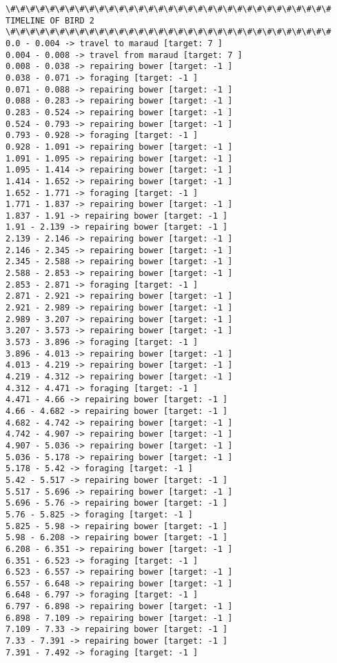 \documentclass[11pt]{article}
\begin{document}
\begin{Verbatim}[commandchars=\\\{\}]
\#\#\#\#\#\#\#\#\#\#\#\#\#\#\#\#\#\#\#\#\#\#\#\#\#\#\#\#\#\#\#\#\#
TIMELINE OF BIRD 2
\#\#\#\#\#\#\#\#\#\#\#\#\#\#\#\#\#\#\#\#\#\#\#\#\#\#\#\#\#\#\#\#\#
0.0 - 0.004 -> travel to maraud [target: 7 ]
0.004 - 0.008 -> travel from maraud [target: 7 ]
0.008 - 0.038 -> repairing bower [target: -1 ]
0.038 - 0.071 -> foraging [target: -1 ]
0.071 - 0.088 -> repairing bower [target: -1 ]
0.088 - 0.283 -> repairing bower [target: -1 ]
0.283 - 0.524 -> repairing bower [target: -1 ]
0.524 - 0.793 -> repairing bower [target: -1 ]
0.793 - 0.928 -> foraging [target: -1 ]
0.928 - 1.091 -> repairing bower [target: -1 ]
1.091 - 1.095 -> repairing bower [target: -1 ]
1.095 - 1.414 -> repairing bower [target: -1 ]
1.414 - 1.652 -> repairing bower [target: -1 ]
1.652 - 1.771 -> foraging [target: -1 ]
1.771 - 1.837 -> repairing bower [target: -1 ]
1.837 - 1.91 -> repairing bower [target: -1 ]
1.91 - 2.139 -> repairing bower [target: -1 ]
2.139 - 2.146 -> repairing bower [target: -1 ]
2.146 - 2.345 -> repairing bower [target: -1 ]
2.345 - 2.588 -> repairing bower [target: -1 ]
2.588 - 2.853 -> repairing bower [target: -1 ]
2.853 - 2.871 -> foraging [target: -1 ]
2.871 - 2.921 -> repairing bower [target: -1 ]
2.921 - 2.989 -> repairing bower [target: -1 ]
2.989 - 3.207 -> repairing bower [target: -1 ]
3.207 - 3.573 -> repairing bower [target: -1 ]
3.573 - 3.896 -> foraging [target: -1 ]
3.896 - 4.013 -> repairing bower [target: -1 ]
4.013 - 4.219 -> repairing bower [target: -1 ]
4.219 - 4.312 -> repairing bower [target: -1 ]
4.312 - 4.471 -> foraging [target: -1 ]
4.471 - 4.66 -> repairing bower [target: -1 ]
4.66 - 4.682 -> repairing bower [target: -1 ]
4.682 - 4.742 -> repairing bower [target: -1 ]
4.742 - 4.907 -> repairing bower [target: -1 ]
4.907 - 5.036 -> repairing bower [target: -1 ]
5.036 - 5.178 -> repairing bower [target: -1 ]
5.178 - 5.42 -> foraging [target: -1 ]
5.42 - 5.517 -> repairing bower [target: -1 ]
5.517 - 5.696 -> repairing bower [target: -1 ]
5.696 - 5.76 -> repairing bower [target: -1 ]
5.76 - 5.825 -> foraging [target: -1 ]
5.825 - 5.98 -> repairing bower [target: -1 ]
5.98 - 6.208 -> repairing bower [target: -1 ]
6.208 - 6.351 -> repairing bower [target: -1 ]
6.351 - 6.523 -> foraging [target: -1 ]
6.523 - 6.557 -> repairing bower [target: -1 ]
6.557 - 6.648 -> repairing bower [target: -1 ]
6.648 - 6.797 -> foraging [target: -1 ]
6.797 - 6.898 -> repairing bower [target: -1 ]
6.898 - 7.109 -> repairing bower [target: -1 ]
7.109 - 7.33 -> repairing bower [target: -1 ]
7.33 - 7.391 -> repairing bower [target: -1 ]
7.391 - 7.492 -> foraging [target: -1 ]

\end{Verbatim}
\end{document}
